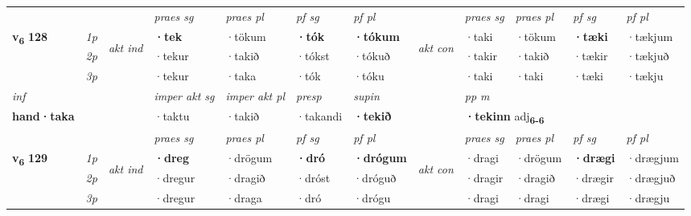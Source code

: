 \begin{longtable}[l]{X>{\footnotesize\itshape}llXXXXlXXXX}
 & &   & \textit{praes sg}  & \textit{praes pl}    & \textit{ pf sg} & \textit{pf pl} & & \textit{praes sg}  & \textit{praes pl}    & \textit{pf sg} & \textit{pf pl }  \\ \cmidrule{4-7} \cmidrule{9-12}
 \multirow{2}{*}{{{\textbf{v{\textsubscript{6}}} \Large{\textbf{128}}}}}  & 1p & \multirow{3}{*}{\begin{turn}{90}\textit{akt ind}\end{turn}} & \textbf{·tek} & ·tökum & \textbf{·tók} & \textbf{·tókum} & \multirow{3}{*}{\begin{turn}{90}\textit{akt con}\end{turn}} &·taki & ·tökum & \textbf{·tæki} & ·tækjum\\*
 & 2p &  &  ·tekur  & ·takið & ·tókst & ·tókuð & & ·takir & ·takið & ·tækir & ·tækjuð \\*
 & 3p &  & ·tekur & ·taka & ·tók & ·tóku & & ·taki & ·taki& ·tæki & ·tækju \\*
\cmidrule{4-7} \cmidrule{9-12}

   {\textit{inf}} & &  & \textit{imper akt sg} & \textit{imper akt pl}   & \textit{presp} & \textit{supin}  && \textit{pp m} \\*
  {\textbf{hand\allowbreak ·taka}} & && ·taktu  & ·takið   & ·takandi &  \textbf{·tekið}  && \multicolumn{2}{l}{\textbf{·tekinn} adj\textbf{\textsubscript{6-6}}} \\*

\midrule

 \midrule
 & &   & \textit{praes sg}  & \textit{praes pl}    & \textit{ pf sg} & \textit{pf pl} & & \textit{praes sg}  & \textit{praes pl}    & \textit{pf sg} & \textit{pf pl }  \\ \cmidrule{4-7} \cmidrule{9-12}
 \multirow{2}{*}{{{\textbf{v{\textsubscript{6}}} \Large{\textbf{129}}}}}  & 1p & \multirow{3}{*}{\begin{turn}{90}\textit{akt ind}\end{turn}} & \textbf{·dreg} & ·drögum & \textbf{·dró} & \textbf{·drógum} & \multirow{3}{*}{\begin{turn}{90}\textit{akt con}\end{turn}} &·dragi & ·drögum & \textbf{·drægi} & ·drægjum\\*
 & 2p &  &  ·dregur  & ·dragið & ·dróst & ·dróguð & & ·dragir & ·dragið & ·drægir & ·drægjuð \\*
 & 3p &  & ·dregur & ·draga & ·dró & ·drógu & & ·dragi & ·dragi& ·drægi & ·drægju \\*
\cmidrule{4-7} \cmidrule{9-12}


\end{longtable}
